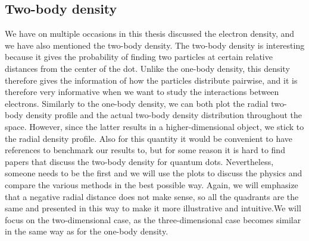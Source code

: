 \subsection{Two-body density}
We have on multiple occasions in this thesis discussed the electron density, and we have also mentioned the two-body density. The two-body density is interesting because it gives the probability of finding two particles at certain relative distances from the center of the dot. Unlike the one-body density, this density therefore gives the information of how the particles distribute pairwise, and it is therefore very informative when we want to study the interactions between electrons. Similarly to the one-body density, we can both plot the radial two-body density profile and the actual two-body density distribution throughout the space. However, since the latter results in a higher-dimensional object, we stick to the radial density profile. Also for this quantity it would be convenient to have references to benchmark our results to, but for some reason it is hard to find papers that discuss the two-body density for quantum dots. Nevertheless, someone needs to be the first and we will use the plots to discuss the physics and compare the various methods in the best possible way. Again, we will emphasize that a negative radial distance does not make sense, so all the quadrants are the same and presented in this way to make it more illustrative and intuitive.We will focus on the two-dimensional case, as the three-dimensional case becomes similar in the same way as for the one-body density. 


